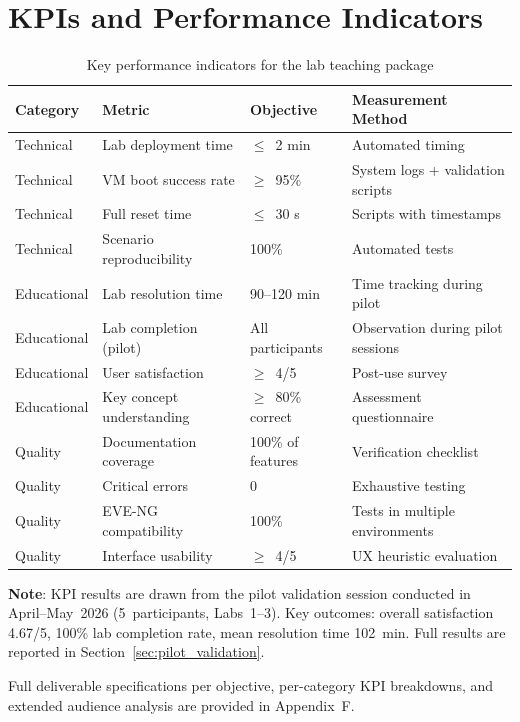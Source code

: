 \section{KPIs and Performance Indicators}

\begin{table}[H]
  \centering
  \small
  \setlength{\tabcolsep}{4pt}
  \renewcommand{\arraystretch}{1.1}
  \begin{tabularx}{\textwidth}{l l l X}
    \toprule
    \textbf{Category} & \textbf{Metric} & \textbf{Objective} & \textbf{Measurement Method} \\
    \midrule
    Technical & Lab deployment time      & $\leq$~2 min     & Automated timing \\
    Technical & VM boot success rate     & $\geq$~95\%      & System logs + validation scripts \\
    Technical & Full reset time          & $\leq$~30 s      & Scripts with timestamps \\
    Technical & Scenario reproducibility & 100\%            & Automated tests \\
    \midrule
    Educational & Lab resolution time    & 90--120 min      & Time tracking during pilot \\
    Educational & Lab completion (pilot) & All participants & Observation during pilot sessions \\
    Educational & User satisfaction      & $\geq$~4/5       & Post-use survey \\
    Educational & Key concept understanding & $\geq$~80\% correct & Assessment questionnaire \\
    \midrule
    Quality & Documentation coverage    & 100\% of features & Verification checklist \\
    Quality & Critical errors           & 0                 & Exhaustive testing \\
    Quality & EVE-NG compatibility      & 100\%             & Tests in multiple environments \\
    Quality & Interface usability       & $\geq$~4/5        & UX heuristic evaluation \\
    \bottomrule
  \end{tabularx}
  \caption{Key performance indicators for the lab teaching package}
  \label{tab:kpi_all}
\end{table}

\noindent \textbf{Note}: KPI results are drawn from the pilot validation session conducted in April--May~2026 (5~participants, Labs~1--3). Key outcomes: overall satisfaction 4.67/5, 100\% lab completion rate, mean resolution time 102~min. Full results are reported in Section~\ref{sec:pilot_validation}.

Full deliverable specifications per objective, per-category KPI breakdowns, and extended
audience analysis are provided in Appendix~F.
